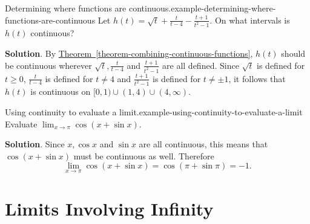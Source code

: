 \documentclass[10pt,]{book}
\numberwithin{equation}{section}
\begin{document}
\begin{example}{Determining where functions are continuous.}{example-determining-where-functions-are-continuous}%
\hypertarget{p-48}{}%
Let \(h(t) = \sqrt{t} + \frac{t}{t-4} - \frac{t+1}{t^{2}-1}\). On what intervals is \(h(t)\) continuous?%
\par\smallskip%
\noindent\textbf{Solution}.\hypertarget{solution-9}{}\quad%
\hypertarget{p-49}{}%
By \hyperref[theorem-combining-continuous-functions]{Theorem~\ref{theorem-combining-continuous-functions}}, \(h(t)\) should be continuous wherever \(\sqrt{t}, \frac{t}{t-4}\) and \(\frac{t+1}{t^{2}-1}\) are all defined. Since \(\sqrt{t}\) is defined for \(t\geq0\), \(\frac{t}{t-4}\) is defined for \(t\neq4\) and \(\frac{t+1}{t^{2}-1}\) is defined for \(t\neq\pm1\), it follows that \(h(t)\) is continuous on \([0,1)\cup(1,4)\cup(4,\infty)\).%
\end{example}
\begin{example}{Using continuity to evaluate a limit.}{example-using-continuity-to-evaluate-a-limit}%
\hypertarget{p-50}{}%
Evaluate \(\lim_{x\to\pi}\cos(x+\sin x)\).%
\par\smallskip%
\noindent\textbf{Solution}.\hypertarget{solution-10}{}\quad%
\hypertarget{p-51}{}%
Since \(x, \cos x\) and \(\sin x\) are all continuous, this means that \(\cos(x+\sin x)\) must be continuous as well. Therefore%
\begin{equation*}
\lim_{x\to\pi}\cos(x+\sin x) = \cos(\pi+\sin\pi) = -1.
\end{equation*}
%
\end{example}
%
%
\typeout{************************************************}
\typeout{************************************************}
%
\section[{Limits Involving Infinity}]{Limits Involving Infinity}\label{section-limits-involving-infinity}
%
%
\typeout{************************************************}
\typeout{************************************************}
%
\end{document}
